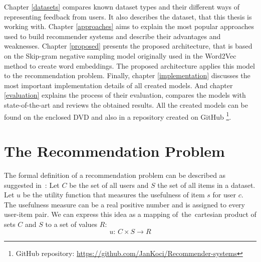 Chapter \ref{datasets} compares known dataset types and their different ways of representing feedback from users. It also describes the dataset, that this thesis is working with. Chapter \ref{approaches} aims to explain the most popular approaches used to build recommender systems and describe their advantages and weaknesses. Chapter \ref{proposed} presents the proposed architecture, that is based on the Skip-gram negative sampling model originally used in the Word2Vec method to create word embeddings. The proposed architecture applies this model to the recommendation problem. Finally, chapter \ref{implementation} discusses the most important implementation details of all created models. And chapter \ref{evaluation} explains the process of their evaluation, compares the models with state-of-the-art and reviews the obtained results. All the created models can be found on the enclosed DVD and also in a repository created on GitHub \footnote{GitHub repository: \url{https://github.com/JanKoci/Recommender-systems}}.


\chapter{The Recommendation Problem} \label{rec_problem}

The formal definition of a recommendation problem can be described as suggested in~\cite{Toward}:
Let $C$ be the set of all users and $S$ the set of all items in a dataset. Let $u$ be the utility function that measures the usefulness of item $s$ for user $c$. The usefulness measure can be a real positive number and is assigned to every user-item pair. We can express this idea as a mapping of~the~cartesian product of sets $C$ and $S$ to a set of values $R$: 
$$u: \, C \times S \rightarrow R$$

